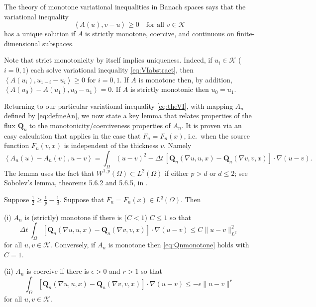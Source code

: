 \documentclass[final,leqno,onefignum,onetabnum]{siamltex1213bueler}
\newcommand\bQ{\mathbf{Q}}
\newcommand\eps{\epsilon}
\renewcommand{\grad}{\nabla}
\newcommand{\ip}[2]{\ensuremath{\left<#1,#2\right>}}
\begin{document}
The theory of monotone variational inequalities in Banach spaces \cite[chapter III]{KinderlehrerStampacchia} says that the variational inequality
\begin{equation}
    \ip{A(u)}{v-u} \ge 0 \quad \text{for all $v\in\mathcal{K}$} \label{eq:VIabstract}
\end{equation}
has a unique solution if $A$ is strictly monotone, coercive, and continuous on finite-dimensional subspaces.

Note that strict monotonicity by itself implies uniqueness.  Indeed, if $u_i \in \mathcal{K}$ ($i=0,1$) each solve variational inequality \eqref{eq:VIabstract}, then $\ip{A(u_i)}{u_{1-i}-u_i} \ge 0$ for $i=0,1$.  If $A$ is monotone then, by addition, $\ip{A(u_0) - A(u_1)}{u_0 - u_1} = 0$.  If $A$ is strictly monotonic then $u_0=u_1$.

Returning to our particular variational inequality \eqref{eq:theVI}, with mapping $A_n$ defined by \eqref{eq:defineAn}, we now state a key lemma that relates properties of the flux $\bQ_n$ to the monotonicity/coerciveness properties of $A_n$.  It is proven via an easy calculation that applies in the case that $F_n=F_n(x)$, i.e.~when the source function $F_n(v,x)$ is independent of the thickness $v$.  Namely
   $$\ip{A_n(u) - A_n(v)}{u-v} = \int_\Omega (u-v)^2 - \Delta t\, \left[\bQ_n(\grad u,u,x) - \bQ_n(\grad v,v,x)\right] \cdot \grad(u-v).$$
The lemma uses the fact that $W^{1,p}(\Omega) \subset L^2(\Omega)$ if either $p>d$ or $d\le 2$; see Sobolev's lemma, theorems 5.6.2 and 5.6.5, in \cite{Evans}.

\begin{lemma}  \label{lem:monotonecoercive}  Suppose $\frac{1}{2} \ge \frac{1}{p} - \frac{1}{d}$.  Suppose that $F_n=F_n(x) \in L^q(\Omega)$.  Then

(i)  $A_n$ is (strictly) monotone if there is ($C<1$) $C\le 1$ so that
\begin{equation}
\Delta t\, \int_\Omega \left[\bQ_n(\grad u,u,x) - \bQ_n(\grad v,v,x)\right] \cdot \grad(u-v) \le C \|u-v\|_{L^2}^2 \label{eq:Qnmonotone}
\end{equation}
for all $u,v \in \mathcal{K}$.  Conversely, if $A_n$ is monotone then \eqref{eq:Qnmonotone} holds with $C=1$.

(ii)  $A_n$ is coercive if there is $\eps>0$ and $r>1$ so that
\begin{equation}
\int_\Omega \left[\bQ_n(\grad u,u,x) - \bQ_n(\grad v,v,x)\right] \cdot \grad(u-v) \le -\eps \|u-v\|^r \label{eq:Qncoercive}
\end{equation}
for all $u,v \in \mathcal{K}$.
\end{lemma}
\end{document}
